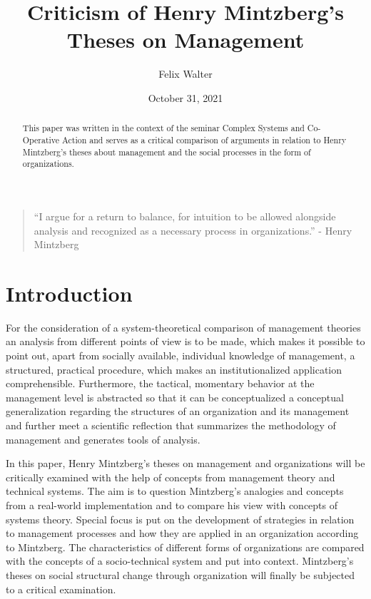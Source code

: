 \documentclass[a4paper,12pt]{article}
\title{Criticism of Henry Mintzberg's Theses on Management}
\author{Felix Walter}
\date{October 31, 2021}
\begin{document}
 
\maketitle 

\begin{abstract}
This paper was written in the context of the seminar Complex Systems and
Co-Operative Action and serves as a critical comparison of arguments in
relation to Henry Mintzberg's theses about management and the social processes
in the form of organizations.
\end{abstract}
\begin{quote}
  “I argue for a return to balance, for intuition to be allowed alongside
  analysis and recognized as a necessary process in organizations.” - Henry
  Mintzberg \cite{Mintzberg}
\end{quote}
\thispagestyle{empty}

\tableofcontents
\newpage

\section{Introduction}

For the consideration of a system-theoretical comparison of management
theories an analysis from different points of view is to be made, which makes
it possible to point out, apart from socially available, individual knowledge
of management, a structured, practical procedure, which makes an
institutionalized application comprehensible. Furthermore, the tactical,
momentary behavior at the management level is abstracted so that it can be
conceptualized a conceptual generalization regarding the structures of an
organization and its management and further meet a scientific reflection that
summarizes the methodology of management and generates tools of analysis.

In this paper, Henry Mintzberg's theses on management and organizations will
be critically examined with the help of concepts from management theory and
technical systems. The aim is to question Mintzberg's analogies and concepts
from a real-world implementation and to compare his view with concepts of
systems theory. Special focus is put on the development of strategies in
relation to management processes and how they are applied in an organization
according to Mintzberg. The characteristics of different forms of
organizations are compared with the concepts of a socio-technical system and
put into context. Mintzberg's theses on social structural change through
organization will finally be subjected to a critical examination.
\end{document}
